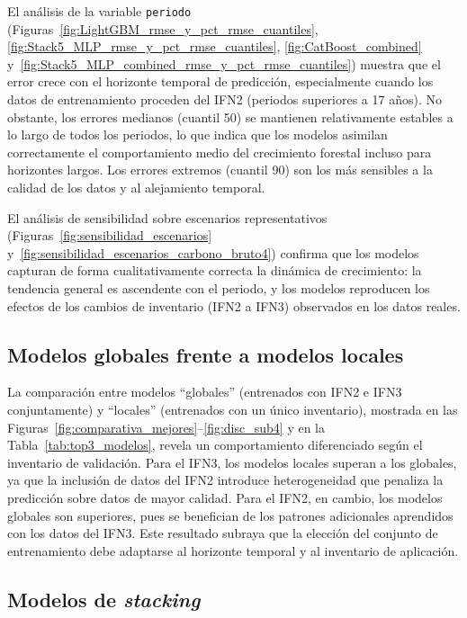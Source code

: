 El análisis de la variable \texttt{periodo} (Figuras~\ref{fig:LightGBM_rmse_y_pct_rmse_cuantiles}, \ref{fig:Stack5_MLP_rmse_y_pct_rmse_cuantiles}, \ref{fig:CatBoost_combined} y~\ref{fig:Stack5_MLP_combined_rmse_y_pct_rmse_cuantiles}) muestra que el error crece con el horizonte temporal de predicción, especialmente cuando los datos de entrenamiento proceden del IFN2 (periodos superiores a 17 años). No obstante, los errores medianos (cuantil 50) se mantienen relativamente estables a lo largo de todos los periodos, lo que indica que los modelos asimilan correctamente el comportamiento medio del crecimiento forestal incluso para horizontes largos. Los errores extremos (cuantil 90) son los más sensibles a la calidad de los datos y al alejamiento temporal.

El análisis de sensibilidad sobre escenarios representativos (Figuras~\ref{fig:sensibilidad_escenarios} y~\ref{fig:sensibilidad_escenarios_carbono_bruto4}) confirma que los modelos capturan de forma cualitativamente correcta la dinámica de crecimiento: la tendencia general es ascendente con el periodo, y los modelos reproducen los efectos de los cambios de inventario (IFN2 a IFN3) observados en los datos reales.

\subsection*{Modelos globales frente a modelos locales}

La comparación entre modelos ``globales'' (entrenados con IFN2 e IFN3 conjuntamente) y ``locales'' (entrenados con un único inventario), mostrada en las Figuras~\ref{fig:comparativa_mejores}--\ref{fig:disc_sub4} y en la Tabla~\ref{tab:top3_modelos}, revela un comportamiento diferenciado según el inventario de validación. Para el IFN3, los modelos locales superan a los globales, ya que la inclusión de datos del IFN2 introduce heterogeneidad que penaliza la predicción sobre datos de mayor calidad. Para el IFN2, en cambio, los modelos globales son superiores, pues se benefician de los patrones adicionales aprendidos con los datos del IFN3. Este resultado subraya que la elección del conjunto de entrenamiento debe adaptarse al horizonte temporal y al inventario de aplicación.

\subsection*{Modelos de \textit{stacking}}

